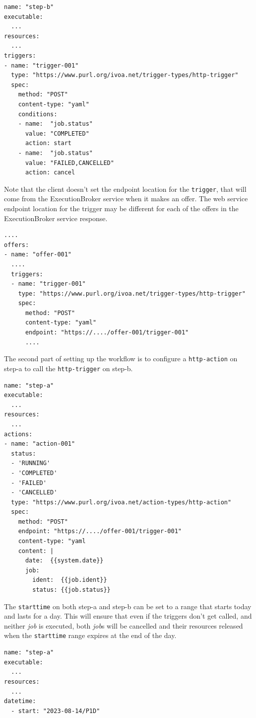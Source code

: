 \documentclass[11pt,a4paper]{ivoa}
\newcommand{\webservice} {web service}
\newcommand{\execbrokerclass} {ExecutionBroker}
\newcommand{\codeword}[1] {\texttt{#1}}
\newcommand{\job} {\textit{job}}
\begin{document}
\begin{lstlisting}[]
name: "step-b"
executable:
  ...
resources:
  ...
triggers:
- name: "trigger-001"
  type: "https://www.purl.org/ivoa.net/trigger-types/http-trigger"
  spec:
    method: "POST"
    content-type: "yaml"
    conditions:
    - name:  "job.status"
      value: "COMPLETED"
      action: start
    - name:  "job.status"
      value: "FAILED,CANCELLED"
      action: cancel
\end{lstlisting}

Note that the client doesn't set the endpoint location for the \codeword{trigger}, that will
come from the \execbrokerclass{} service when it makes an offer.
The \webservice{} endpoint location for the trigger may be different for each of the
offers in the \execbrokerclass{} service response.

\begin{lstlisting}[]
....
offers:
- name: "offer-001"
  ....
  triggers:
  - name: "trigger-001"
    type: "https://www.purl.org/ivoa.net/trigger-types/http-trigger"
    spec:
      method: "POST"
      content-type: "yaml"
      endpoint: "https://..../offer-001/trigger-001"
      ....
\end{lstlisting}

The second part of setting up the workflow is to configure a \codeword{http-action}
on step-a to call the \codeword{http-trigger} on step-b.

\begin{lstlisting}[]
name: "step-a"
executable:
  ...
resources:
  ...
actions:
- name: "action-001"
  status:
  - 'RUNNING'
  - 'COMPLETED'
  - 'FAILED'
  - 'CANCELLED'
  type: "https://www.purl.org/ivoa.net/action-types/http-action"
  spec:
    method: "POST"
    endpoint: "https://..../offer-001/trigger-001"
    content-type: "yaml
    content: |
      date:  {{system.date}}
      job:
        ident:  {{job.ident}}
        status: {{job.status}}
\end{lstlisting}

The \codeword{starttime} on both step-a and step-b can be set to a range that starts today and lasts for a day.
This will ensure that even if the triggers don't get called, and neither \job{} is executed, both \job{}s will
be cancelled and their resources released when the \codeword{starttime} range expires at the end of the day.

\begin{lstlisting}[]
name: "step-a"
executable:
  ...
resources:
  ...
datetime:
  - start: "2023-08-14/P1D"
\end{lstlisting}
\end{document}
